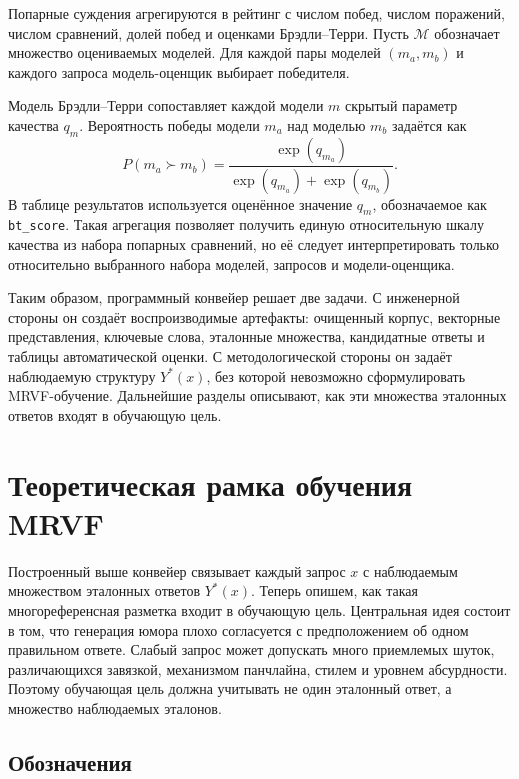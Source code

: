 Попарные суждения агрегируются в рейтинг с числом побед, числом поражений, числом сравнений, долей побед и оценками Брэдли--Терри. Пусть \(\mathcal{M}\) обозначает множество оцениваемых моделей. Для каждой пары моделей \((m_a,m_b)\) и каждого запроса модель-оценщик выбирает победителя.

Модель Брэдли--Терри сопоставляет каждой модели \(m\) скрытый параметр качества \(q_m\). Вероятность победы модели \(m_a\) над моделью \(m_b\) задаётся как
\[
    P(m_a \succ m_b)
    =
    \frac{\exp(q_{m_a})}
    {\exp(q_{m_a})+\exp(q_{m_b})}.
\]
В таблице результатов используется оценённое значение \(q_m\), обозначаемое как \texttt{bt\_score}. Такая агрегация позволяет получить единую относительную шкалу качества из набора попарных сравнений, но её следует интерпретировать только относительно выбранного набора моделей, запросов и модели-оценщика.

Таким образом, программный конвейер решает две задачи. С инженерной стороны он создаёт воспроизводимые артефакты: очищенный корпус, векторные представления, ключевые слова, эталонные множества, кандидатные ответы и таблицы автоматической оценки. С методологической стороны он задаёт наблюдаемую структуру \(Y^{*}(x)\), без которой невозможно сформулировать MRVF-обучение. Дальнейшие разделы описывают, как эти множества эталонных ответов входят в обучающую цель.

\section{Теоретическая рамка обучения MRVF}

Построенный выше конвейер связывает каждый запрос \(x\) с наблюдаемым множеством эталонных ответов \(Y^{*}(x)\). Теперь опишем, как такая многореференсная разметка входит в обучающую цель. Центральная идея состоит в том, что генерация юмора плохо согласуется с предположением об одном правильном ответе. Слабый запрос может допускать много приемлемых шуток, различающихся завязкой, механизмом панчлайна, стилем и уровнем абсурдности. Поэтому обучающая цель должна учитывать не один эталонный ответ, а множество наблюдаемых эталонов.

\subsection{Обозначения}

